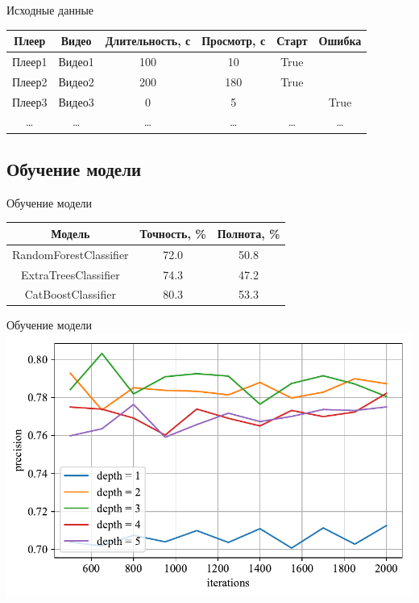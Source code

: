 \documentclass{beamer}
\begin{document}
\begin{frame}{Исходные данные}
    \begin{table}
        \centering
        \begin{tabular}{|c|c|c|c|c|c|}
            \hline
            Плеер & Видео & Длительность, с & Просмотр, с & Старт & Ошибка \\
            \hline
            Плеер1 & Видео1 & 100 & 10 & True & \\
            \hline
            Плеер2 & Видео2 & 200 & 180 & True & \\
            \hline
            Плеер3 & Видео3 & 0 & 5 & & True \\
            \hline
            \ldots & \ldots & \ldots & \ldots & \ldots & \ldots \\
            \hline
        \end{tabular}
    \end{table}
\end{frame}

\subsection{Обучение модели}

\begin{frame}{Обучение модели}
    \begin{table}
        \centering
        \begin{tabular}{|c|c|c|}
            \hline
            Модель & Точность, \% & Полнота, \% \\
            \hline
            RandomForestClassifier & 72.0 & 50.8 \\
            \hline
            ExtraTreesClassifier & 74.3 & 47.2 \\
            \hline
            CatBoostClassifier & 80.3 & 53.3 \\
            \hline
        \end{tabular}
    \end{table}
\end{frame}

\begin{frame}{Обучение модели}
    \includegraphics[width=\textwidth]{../images/toloka_catboost_precision.pdf}
\end{frame}
\end{document}
